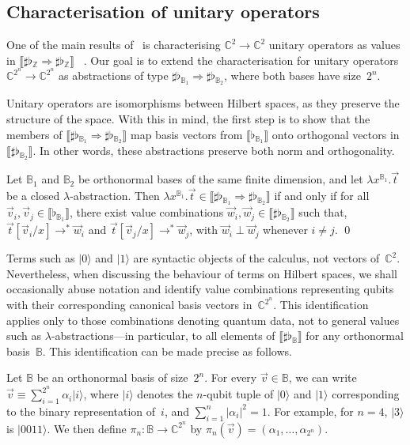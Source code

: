 \documentclass[a4paper,UKenglish,numberwithinsect,pdfa,anonymous]{lipics-v2021}
\theoremstyle{restatestyle}
\newcommand\ket[1]{\ensuremath{|#1\rangle}}
\newcommand\lra{\longrightarrow}
\def\C{\mathbb{C}}            %
\def\Lam#1#2#3{\lambda#1^{#2}{.}#3} %
\def\eval{\lra^*}
\def\BB{\mathbb{B}}
\def\Arr{\Rightarrow}
\def\sem#1{\llbracket#1\rrbracket}
\newcommand\B{\mathbb Z}
\newcommand\basis[1]{\ensuremath{\flat_{#1}}}
\begin{document}
\subsection{Characterisation of unitary operators}

One of the main results of~\cite{DiazcaroGuillermoMiquelValironLICS19}
is characterising $\C^2\to\C^2$ unitary operators as values in
$\sem{\sharp\basis{\B}\Arr\sharp\basis{\B}}$~
\cite[Theorem IV.12]{DiazcaroGuillermoMiquelValironLICS19}.
Our goal is to extend the characterisation for unitary operators
$\C^{2^n}\to\C^{2^n}$ as abstractions of type $\sharp\basis{\BB_1}
\Arr\sharp\basis{\BB_2}$, where both bases have size~$2^n$.

Unitary operators are isomorphisms between Hilbert spaces, as they preserve the
structure of the space. With this in mind, the first step is to show that the
members of $\sem{\sharp\basis{\BB_1}\Arr\sharp\basis{\BB_2}}$ map basis vectors
from $\sem{\basis{\BB_1}}$ onto orthogonal vectors in $\sem{\sharp\basis{\BB_2}}$. In other
words, these abstractions preserve both norm and orthogonality.

\begin{lemma}\label{lem:BasesIso}
  Let $\BB_1$ and $\BB_2$ be orthonormal bases of the same finite
  dimension, and let $\Lam{x}{{\BB_1}}{\vec t}$ be a closed $\lambda$-abstraction.
  Then $\Lam{x}{{\BB_1}}{\vec t}\in\sem{\sharp\basis{\BB_1}\Arr\sharp\basis{\BB_2}}$
  if and only if 
  for all $\vec{v}_{i},\vec{v}_{j}\in\sem{\basis{\BB_1}}$,
  there exist value combinations
  $\vec{w}_{i},\vec{w}_{j}\in\sem{\sharp\basis{\BB_2}}$ such that,
    $\vec{t}[\vec{v}_{i}/x]\eval\vec{w}_{i}$
    and
    $\vec{t}[\vec{v}_{j}/x]\eval\vec{w}_{j}$,
    with
    $\vec{w}_{i}\perp\vec{w}_{j}$ whenever $i\neq j$.
    \qed
\end{lemma}

Terms such as $\ket{0}$ and $\ket{1}$ are syntactic objects of the
calculus, not vectors of~$\C^2$. Nevertheless, when discussing the behaviour of
terms on Hilbert spaces, we shall occasionally abuse notation and identify
value combinations representing qubits with their corresponding canonical
basis vectors in~$\C^{2^n}$. This identification applies only to those
combinations denoting quantum data, not to general values such as
$\lambda$-abstractions---in particular, to all elements of
$\sem{\sharp\basis{\BB}}$ for any orthonormal basis~$\BB$. This identification can
be made precise as follows.

\begin{definition}
  Let $\BB$ be an orthonormal basis of size~$2^n$. For every $\vec{v}\in \BB$, we can
  write
  \(
    \vec{v}\equiv \sum_{i=1}^{2^n}\alpha_i\ket{i}
  \),
  where $\ket{i}$ denotes the $n$-qubit tuple of $\ket{0}$ and $\ket{1}$
  corresponding to the binary representation of~$i$, and
  $\sum_{i=1}^{n}|\alpha_i|^2=1$. For example, for $n=4$, $\ket{3}$ is
  $\ket{0011}$. We then define $\pi_n:\BB\to\C^{2^n}$ by
  \(
    \pi_n(\vec{v}) = (\alpha_1,\dotsc,\alpha_{2^n})
  \).
\end{definition}
\end{document}
